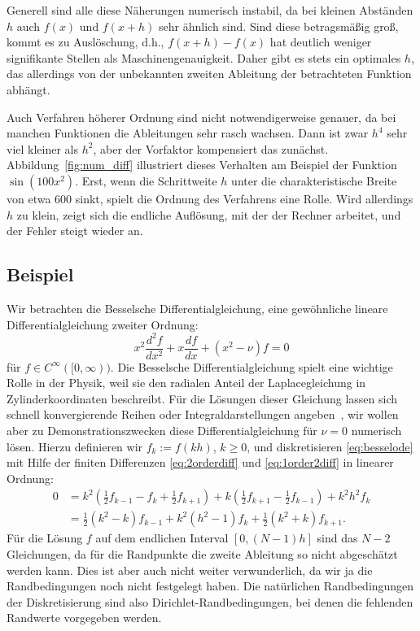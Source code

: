 Generell sind alle diese Näherungen numerisch instabil, da bei kleinen
Abständen $h$ auch $f(x)$ und $f(x+h)$ sehr ähnlich sind. Sind diese
betragsmäßig groß, kommt es zu Auslöschung, d.h., $f(x+h) - f(x)$ hat
deutlich weniger signifikante Stellen als Maschinengenauigkeit. Daher
gibt es stets ein optimales $h$, das allerdings von der unbekannten
zweiten Ableitung der betrachteten Funktion abhängt.

Auch Verfahren höherer Ordnung sind nicht notwendigerweise genauer, da
bei manchen Funktionen die Ableitungen sehr rasch wachsen. Dann ist
zwar $h^4$ sehr viel kleiner als $h^2$, aber der Vorfaktor
kompensiert das zunächst. Abbildung~\ref{fig:num_diff} illustriert
dieses Verhalten am Beispiel der Funktion $\sin(100x^2)$. Erst, wenn
die Schrittweite $h$ unter die charakteristische Breite von etwa 600
sinkt, spielt die Ordnung des Verfahrens eine Rolle. Wird allerdings
$h$ zu klein, zeigt sich die endliche Auflösung, mit der der Rechner
arbeitet, und der Fehler steigt wieder an.

\subsection{Beispiel}

Wir betrachten die Besselsche Differentialgleichung, eine gewöhnliche
lineare Differentialgleichung zweiter Ordnung:
\begin{equation}
  \label{eq:besselode}
  x^2\frac{d^2f}{dx^2} + x\frac{df}{dx} + (x^2-\nu)f = 0
\end{equation}
für $f\in C^{\infty}([0,\infty))$. Die Besselsche
Differentialgleichung spielt eine wichtige Rolle in der Physik, weil
sie den radialen Anteil der Laplacegleichung in Zylinderkoordinaten
beschreibt.  Für die Lösungen dieser Gleichung lassen sich schnell
konvergierende Reihen oder Integraldarstellungen
angeben~\cite{abramowitz70a,jackson99}, wir wollen aber zu
Demonstrationszwecken diese Differentialgleichung für $\nu=0$
numerisch lösen. Hierzu definieren wir $f_k := f(kh)$, $k\ge 0$, und
diskretisieren \eqref{eq:besselode} mit Hilfe der finiten Differenzen
\eqref{eq:2orderdiff} und \eqref{eq:1order2diff} in linearer Ordnung:
\begin{align}
  \label{eq:besseldiscrete}
  0 &= k^2\left(\frac{1}{2} f_{k-1} - f_k + \frac{1}{2} f_{k+1} \right)
  + k\left(\frac{1}{2} f_{k+1} - \frac{1}{2} f_{k-1}\right)
  + k^2h^2f_k\nonumber\\
  &= \frac{1}{2}(k^2 - k)f_{k-1}
  + k^2(h^2 - 1)f_k
  + \frac{1}{2}(k^2 + k)f_{k+1}.
\end{align}
Für die Lösung $f$ auf dem endlichen Interval $[0, (N-1)h]$ sind das
$N-2$ Gleichungen, da für die Randpunkte die zweite Ableitung so nicht
abgeschätzt werden kann. Dies ist aber auch nicht weiter
verwunderlich, da wir ja die Randbedingungen noch nicht festgelegt
haben. Die natürlichen Randbedingungen der Diskretisierung sind also
Dirichlet-Randbedingungen, bei denen die fehlenden Randwerte
vorgegeben werden.

